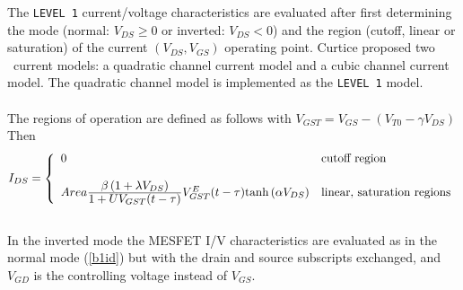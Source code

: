 The {\tt LEVEL 1} current/voltage characteristics are evaluated after first
determining the mode (normal: $V_{DS} \ge 0$ or inverted:
$V_{DS} < 0$) and the region (cutoff,
linear or saturation) of the current
$(V_{DS}, V_{GS})$ operating point. Curtice \cite{curtice:80}
proposed two \dc\ current models: a quadratic channel current model
and a cubic channel current model.  The quadratic channel model is
implemented as the {\tt LEVEL 1} model.\\[0.1in]
\\[0.2in]
The regions of operation are defined as follows
with $V_{GST} = V_{GS}-(V_{T0}-\gamma V_{DS})$ \inlineeq
\hspace*{\fill}\\[0.1in]
Then
\begin{equation}
I_{DS} = \left\{ \begin{array}{ll}
      0  & \mbox{cutoff region} \\ \\
      Area {{\textstyle \beta \left(1 + \lambda V_{DS}\right)}
      \over {\textstyle 1+UV_{GST}(t-\tau)}}
       V_{GST}^E(t-\tau)
      \mbox{tanh}\left(\alpha V_{DS}\right)
         &\mbox{linear, saturation regions} \end{array} \right. %
      \label{b1id}
\end{equation}
\\[0.2in]
In the inverted mode the MESFET I/V characteristics are evaluated as in the
normal mode (\ref{b1id}) but with the drain and source subscripts
exchanged, and $V_{GD}$ is the controlling voltage instead of $V_{GS}$.

